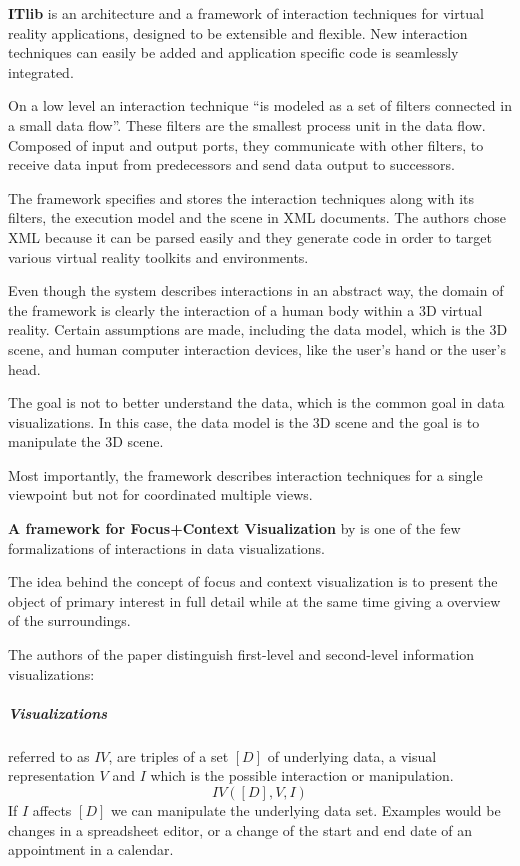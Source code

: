 \textbf{ITlib\cite{Figueroa2001}} is an architecture and a framework of interaction techniques for virtual reality applications, designed to be extensible and flexible.
New interaction techniques can easily be added and application specific code is seamlessly integrated.

On a low level an interaction technique ``is modeled as a set of filters connected in a small data flow''\cite[p.~2]{Figueroa2001}.
These filters are the smallest process unit in the data flow.
Composed of input and output ports, they communicate with other filters, to receive data input from predecessors and send data output to successors.

The framework specifies and stores the interaction techniques along with its filters, the execution model and the scene in XML documents.
The authors chose XML because it can be parsed easily and they generate code in order to target various virtual reality toolkits and environments.

Even though the system describes interactions in an abstract way, the domain of the framework is clearly the interaction of a human body within a 3D virtual reality.
Certain assumptions are made, including the data model, which is the 3D scene, and human computer interaction devices, like the user's hand or the user's head.

The goal is not to better understand the data, which is the common goal in data visualizations.
In this case, the data model is the 3D scene and the goal is to manipulate the 3D scene.

Most importantly, the framework describes interaction techniques for a single viewpoint but not for coordinated multiple views.

\textbf{A framework for Focus+Context Visualization} by \textcite{Bjork1999} is one of the few formalizations of interactions in data visualizations.

The idea behind the concept of focus and context visualization is to present the object of primary interest in full detail while at the same time giving a overview of the surroundings.

The authors of the paper distinguish first-level and second-level information visualizations:
\subparagraph{Visualizations} referred to as $IV$, are triples of a set $[D]$ of underlying data, a visual representation $V$ and $I$ which is the possible interaction or manipulation.
\begin{equation}
  IV([D], V, I)
\end{equation}
If $I$ affects $[D]$ we can manipulate the underlying data set.
Examples would be changes in a spreadsheet editor, or a change of the start and end date of an appointment in a calendar.

